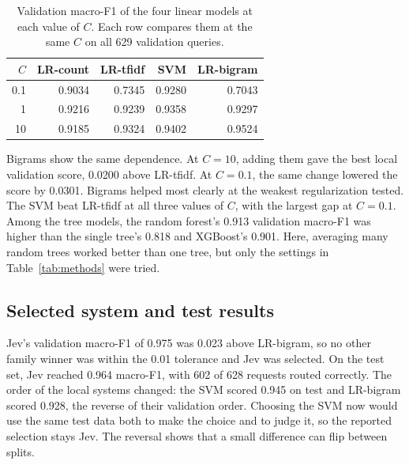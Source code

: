 \documentclass[conference]{IEEEtran}
\begin{document}
\begin{table}[tbp]
\centering\caption{Validation macro-F1 of the four linear models at each value of \(C\). Each row compares them at the same \(C\) on all 629 validation queries.}\label{tab:matched}
\begin{tabular}{rrrrr}\toprule
\(C\)&LR-count&LR-tfidf&SVM&LR-bigram\\ \midrule
0.1 & 0.9034 & 0.7345 & 0.9280 & 0.7043\\
1 & 0.9216 & 0.9239 & 0.9358 & 0.9297\\
10 & 0.9185 & 0.9324 & 0.9402 & 0.9524\\ \bottomrule
\end{tabular}
\end{table}

Bigrams show the same dependence. At \(C=10\), adding them gave the best local validation score, 0.0200 above LR-tfidf. At \(C=0.1\), the same change lowered the score by 0.0301. Bigrams helped most clearly at the weakest regularization tested. The SVM beat LR-tfidf at all three values of \(C\), with the largest gap at \(C=0.1\). Among the tree models, the random forest's 0.913 validation macro-F1 was higher than the single tree's 0.818 and XGBoost's 0.901. Here, averaging many random trees worked better than one tree, but only the settings in Table~\ref{tab:methods} were tried.

\subsection{Selected system and test results}
Jev's validation macro-F1 of 0.975 was 0.023 above LR-bigram, so no other family winner was within the 0.01 tolerance and Jev was selected. On the test set, Jev reached 0.964 macro-F1, with 602 of 628 requests routed correctly. The order of the local systems changed: the SVM scored 0.945 on test and LR-bigram scored 0.928, the reverse of their validation order. Choosing the SVM now would use the same test data both to make the choice and to judge it, so the reported selection stays Jev. The reversal shows that a small difference can flip between splits.
\end{document}

